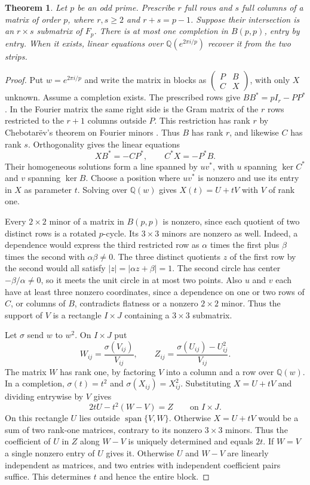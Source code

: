 \documentclass[11pt,a4paper]{article}
\newtheorem{theorem}{Theorem}[section]
\numberwithin{equation}{section}
\begin{document}
\begin{theorem}\label{prime:strip-reconstruction}
Let $p$ be an odd prime. Prescribe $r$ full rows and $s$ full columns of a matrix of order $p$, where $r,s\ge2$ and $r+s=p-1$. Suppose their intersection is an $r\times s$ submatrix of $F_p$. There is at most one completion in $B(p,p)$, entry by entry. When it exists, linear equations over $\mathbb Q(e^{2\pi i/p})$ recover it from the two strips.
\end{theorem}
\begin{proof}
Put $w=e^{2\pi i/p}$ and write the matrix in blocks as $\left(\begin{smallmatrix}P&B\\C&X\end{smallmatrix}\right)$, with only $X$ unknown. Assume a completion exists. The prescribed rows give $BB^*=pI_r-PP^*$. In the Fourier matrix the same right side is the Gram matrix of the $r$ rows restricted to the $r+1$ columns outside $P$. This restriction has rank $r$ by Chebotar\"ev's theorem on Fourier minors \cite[Lemma~1.3]{tao}. Thus $B$ has rank $r$, and likewise $C$ has rank $s$. Orthogonality gives the linear equations
$$XB^*=-CP^*,\qquad C^*X=-P^*B.$$
Their homogeneous solutions form a line spanned by $uv^*$, with $u$ spanning $\ker C^*$ and $v$ spanning $\ker B$. Choose a position where $uv^*$ is nonzero and use its entry in $X$ as parameter $t$. Solving over $\mathbb Q(w)$ gives $X(t)=U+tV$ with $V$ of rank one.

Every $2\times2$ minor of a matrix in $B(p,p)$ is nonzero, since each quotient of two distinct rows is a rotated $p$-cycle. Its $3\times3$ minors are nonzero as well. Indeed, a dependence would express the third restricted row as $\alpha$ times the first plus $\beta$ times the second with $\alpha\beta\ne0$. The three distinct quotients $z$ of the first row by the second would all satisfy $|z|=|\alpha z+\beta|=1$. The second circle has center $-\beta/\alpha\ne0$, so it meets the unit circle in at most two points. Also $u$ and $v$ each have at least three nonzero coordinates, since a dependence on one or two rows of $C$, or columns of $B$, contradicts flatness or a nonzero $2\times2$ minor. Thus the support of $V$ is a rectangle $I\times J$ containing a $3\times3$ submatrix.

Let $\sigma$ send $w$ to $w^2$. On $I\times J$ put
$$W_{ij}=\frac{\sigma(V_{ij})}{V_{ij}},\qquad Z_{ij}=\frac{\sigma(U_{ij})-U_{ij}^2}{V_{ij}}.$$
The matrix $W$ has rank one, by factoring $V$ into a column and a row over $\mathbb Q(w)$. In a completion, $\sigma(t)=t^2$ and $\sigma(X_{ij})=X_{ij}^2$. Substituting $X=U+tV$ and dividing entrywise by $V$ gives
$$2tU-t^2(W-V)=Z\qquad\text{on }I\times J.$$
On this rectangle $U$ lies outside $\operatorname{span}\{V,W\}$. Otherwise $X=U+tV$ would be a sum of two rank-one matrices, contrary to its nonzero $3\times3$ minors. Thus the coefficient of $U$ in $Z$ along $W-V$ is uniquely determined and equals $2t$. If $W=V$ a single nonzero entry of $U$ gives it. Otherwise $U$ and $W-V$ are linearly independent as matrices, and two entries with independent coefficient pairs suffice. This determines $t$ and hence the entire block.
\end{proof}
\end{document}
